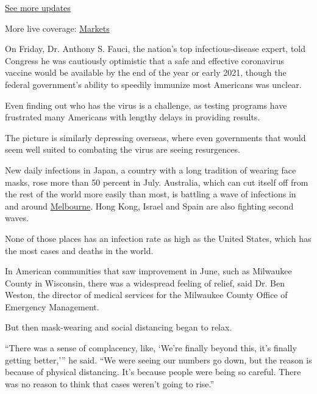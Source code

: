 \href{https://www.nytimes3xbfgragh.onion/2020/08/21/world/covid-19-coronavirus.html?action=click\&pgtype=Article\&state=default\&region=MAIN_CONTENT_1\&context=storylines_live_updates}{See
more updates}

More live coverage:
\href{https://www.nytimes3xbfgragh.onion/live/2020/08/20/business/stock-market-today-coronavirus?action=click\&pgtype=Article\&state=default\&region=MAIN_CONTENT_1\&context=storylines_live_updates}{Markets}

On Friday, Dr. Anthony S. Fauci, the nation's top infectious-disease
expert, told Congress he was cautiously optimistic that a safe and
effective coronavirus vaccine would be available by the end of the year
or early 2021, though the federal government's ability to speedily
immunize most Americans was unclear.

Even finding out who has the virus is a challenge, as testing programs
have frustrated many Americans with lengthy delays in providing results.

The picture is similarly depressing overseas, where even governments
that would seem well suited to combating the virus are seeing
resurgences.

New daily infections in Japan, a country with a long tradition of
wearing face masks, rose more than 50 percent in July. Australia, which
can cut itself off from the rest of the world more easily than most, is
battling a wave of infections in and around
\href{https://www.nytimes3xbfgragh.onion/2020/08/04/world/australia/coronavirus-melbourne-lockdown.html}{Melbourne}.
Hong Kong, Israel and Spain are also fighting second waves.

None of those places has an infection rate as high as the United States,
which has the most cases and deaths in the world.

In American communities that saw improvement in June, such as Milwaukee
County in Wisconsin, there was a widespread feeling of relief, said Dr.
Ben Weston, the director of medical services for the Milwaukee County
Office of Emergency Management.

But then mask-wearing and social distancing began to relax.

``There was a sense of complacency, like, `We're finally beyond this,
it's finally getting better,''' he said. ``We were seeing our numbers go
down, but the reason is because of physical distancing. It's because
people were being so careful. There was no reason to think that cases
weren't going to rise.''

